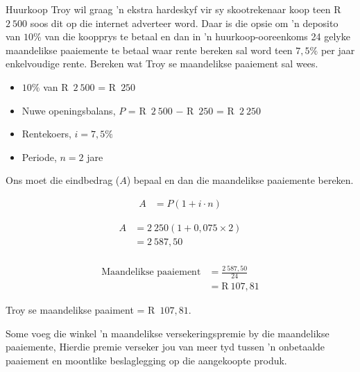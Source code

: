 \begin{wex}{Huurkoop}{
    Troy wil graag ’n ekstra hardeskyf vir sy
skootrekenaar koop teen R~$2~500$ soos dit op die internet adverteer word.
Daar is die opsie om ’n deposito van $10\%$ van die koopprys te betaal
en dan in ’n huurkoop-ooreenkoms 24 gelyke maandelikse paaiemente
te betaal waar rente bereken sal word teen $7,5\%$ per jaar enkelvoudige
rente. Bereken wat Troy se maandelikse paaiement sal wees.}{

    \begin{itemize}
	\item $10\%$ van R~$2~500$ = R~$250$\\
	\item Nuwe openingsbalans, $P$ = R~$2~500$ − R~$250$ = R~$2~250$\\
	\item Rentekoers, $i = 7,5\%$\\
	\item Periode, $n = 2$ jare
    \end{itemize}

    Ons moet die eindbedrag ($A$) bepaal en dan die maandelikse
paaiemente bereken.

    \begin{align*}
	    A &= P(1 + i \cdot n)
    \end{align*}

    \begin{align*}
	A &= 2~250(1 + 0,075 \times 2)\\
	  &= 2~587,50\\
    \end{align*}

    \begin{align*}
	\text{Maandelikse paaiement} &= \frac{2~587,50}{24}\\
			&= \text{R}~107,81
    \end{align*}

    Troy se maandelikse paaiment = R~$107,81$.
}
\end{wex}


Some voeg die winkel 'n maandelikse versekeringspremie by die maandelikse paaiemente, Hierdie premie verseker jou van meer tyd tussen 'n onbetaalde paaiement en moontlike beslaglegging op die aangekoopte produk.


